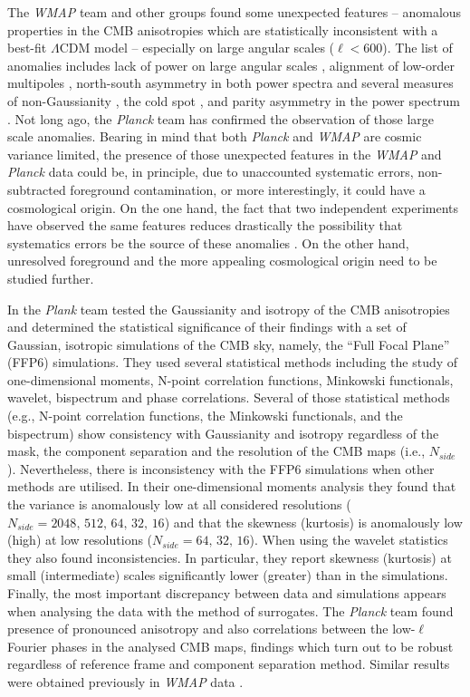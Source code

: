 The \textit{WMAP} team \cite{Spergel:2003cb} and other groups found some unexpected features -- anomalous properties in the CMB anisotropies which are statistically inconsistent with a best-fit $\Lambda$CDM model -- especially on large angular scales ($\ell < 600$). The list of anomalies includes lack of power on large angular scales \cite{Copi:2006tu}, alignment of low-order multipoles \cite{Tegmark:2003ve,Schwarz:2004gk,Bielewicz:2005zu,Land:2005ad}, north-south asymmetry in both power spectra \cite{Eriksen:2003db,Hansen:2008ym} and several measures of non-Gaussianity \cite{Eriksen:2004df,Eriksen:2004iu,Rath:2007ti,Rossmanith:2009cy}, the cold spot \cite{Vielva:2003et,Cruz:2004ce}, and parity asymmetry in the power spectrum \cite{Kim:2010gf}. Not long ago, the \textit{Planck} team has confirmed the observation of those large scale anomalies. Bearing in mind that both \textit{Planck} and \textit{WMAP} are cosmic variance limited, the presence of those unexpected features in the \textit{WMAP} and \textit{Planck} data could be, in principle, due to unaccounted systematic errors, non-subtracted foreground contamination, or more interestingly, it could have a cosmological origin. On the one hand, the fact that two independent experiments have observed the same features reduces drastically the possibility that systematics errors be the source of these anomalies \cite{Larson:2014roa}. On the other hand, unresolved foreground and the more appealing cosmological origin need to be studied further. 

In \cite{Ade:2013nlj} the \textit{Plank} team tested the Gaussianity and isotropy of  the CMB anisotropies and determined the statistical significance of their findings with a set of Gaussian, isotropic simulations of the CMB sky, namely, the ``Full Focal Plane'' (FFP6) simulations. They used several statistical methods including the study of one-dimensional moments, N-point correlation functions, Minkowski functionals, wavelet, bispectrum and phase correlations. Several of those statistical methods (e.g., N-point correlation functions, the Minkowski functionals, and the bispectrum) show consistency with Gaussianity and isotropy regardless of the mask, the component separation and the resolution of the CMB maps (i.e., $N_{side}$). Nevertheless, there is inconsistency with the FFP6 simulations when other methods are utilised. In their one-dimensional moments analysis they found that the variance is anomalously low at all considered resolutions ($N_{side}=2048,\, 512,\, 64,\, 32,\, 16$) and that the skewness (kurtosis) is anomalously low (high) at low resolutions ($N_{side}=64,\,32,\,16$). When using the wavelet statistics they also found inconsistencies. In particular, they report skewness (kurtosis) at small (intermediate) scales significantly lower (greater) than in the simulations. Finally, the most important discrepancy between data and simulations appears when analysing the data with the method of surrogates. The \textit{Planck} team found presence of pronounced anisotropy and also correlations between the low-$\ell$ Fourier phases in the analysed CMB maps, findings which turn out to be robust regardless of reference frame and component separation method. Similar results were obtained previously in \textit{WMAP} data \cite{Rossmanith:2009cy}. 

